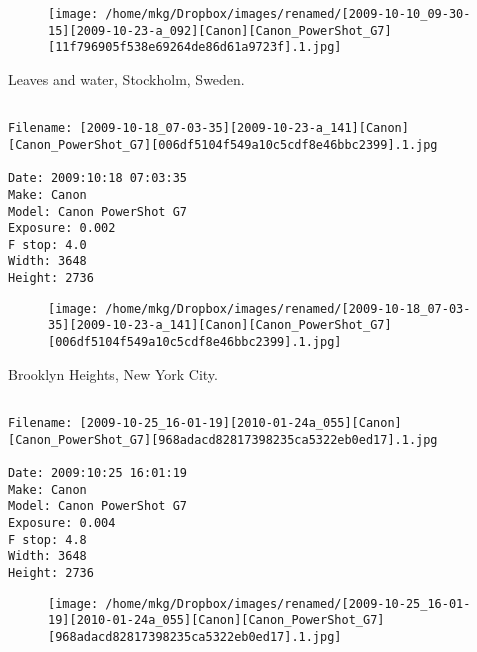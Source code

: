 \begin{figure}
\texttt{[image: /home/mkg/Dropbox/images/renamed/[2009-10-10\_09-30-15][2009-10-23-a\_092][Canon][Canon\_PowerShot\_G7][11f796905f538e69264de86d61a9723f].1.jpg]}
\end{figure}
    
\clearpage
\onecolumn
\noindent Leaves and water, Stockholm, Sweden.
\noindent
\begin{lstlisting}

Filename: [2009-10-18_07-03-35][2009-10-23-a_141][Canon][Canon_PowerShot_G7][006df5104f549a10c5cdf8e46bbc2399].1.jpg

Date: 2009:10:18 07:03:35
Make: Canon
Model: Canon PowerShot G7
Exposure: 0.002
F stop: 4.0
Width: 3648
Height: 2736
\end{lstlisting}
\clearpage

\begin{figure}
\texttt{[image: /home/mkg/Dropbox/images/renamed/[2009-10-18\_07-03-35][2009-10-23-a\_141][Canon][Canon\_PowerShot\_G7][006df5104f549a10c5cdf8e46bbc2399].1.jpg]}
\end{figure}
    
\clearpage
\onecolumn
\noindent Brooklyn Heights, New York City.
\noindent
\begin{lstlisting}

Filename: [2009-10-25_16-01-19][2010-01-24a_055][Canon][Canon_PowerShot_G7][968adacd82817398235ca5322eb0ed17].1.jpg

Date: 2009:10:25 16:01:19
Make: Canon
Model: Canon PowerShot G7
Exposure: 0.004
F stop: 4.8
Width: 3648
Height: 2736
\end{lstlisting}
\clearpage

\begin{figure}
\texttt{[image: /home/mkg/Dropbox/images/renamed/[2009-10-25\_16-01-19][2010-01-24a\_055][Canon][Canon\_PowerShot\_G7][968adacd82817398235ca5322eb0ed17].1.jpg]}
\end{figure}
    
